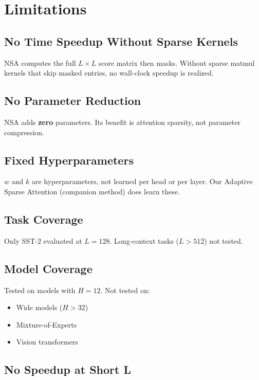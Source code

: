 
\section{Limitations}

\subsection{No Time Speedup Without Sparse Kernels}

NSA computes the full $L \times L$ score matrix then masks. Without sparse 
matmul kernels that skip masked entries, no wall-clock speedup is realized.

\subsection{No Parameter Reduction}

NSA adds \textbf{zero} parameters. Its benefit is attention sparsity, not 
parameter compression.

\subsection{Fixed Hyperparameters}

$w$ and $k$ are hyperparameters, not learned per head or per layer. Our 
Adaptive Sparse Attention (companion method) does learn these.

\subsection{Task Coverage}

Only SST-2 evaluated at $L = 128$. Long-context tasks ($L > 512$) not 
tested.

\subsection{Model Coverage}

Tested on models with $H = 12$. Not tested on:
\begin{itemize}
\item Wide models ($H > 32$)
\item Mixture-of-Experts
\item Vision transformers

\end{itemize}
\subsection{No Speedup at Short L}

